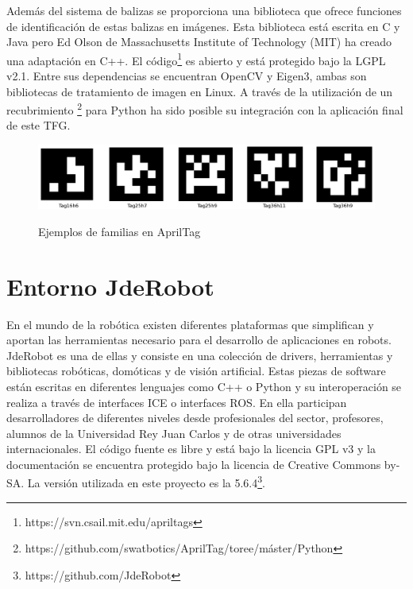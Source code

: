 {	Además del sistema de balizas se proporciona una biblioteca que ofrece funciones de identificación de estas balizas en imágenes. Esta biblioteca está escrita en C y Java pero Ed Olson de Massachusetts Institute of Technology (MIT) ha creado una adaptación en C++. El código\footnote{https://svn.csail.mit.edu/apriltags} es abierto y está protegido bajo la LGPL v2.1. Entre sus dependencias se encuentran OpenCV y Eigen3, ambas son bibliotecas de tratamiento de imagen en Linux. A través de la utilización de un recubrimiento \footnote{https://github.com/swatbotics/AprilTag/toree/máster/Python} para Python ha sido posible su integración con la aplicación final de este TFG.
	
	\begin{figure}[H]
		\centering
		{\includegraphics[scale=0.2]{imag/apriltags-codes.png}}
		\caption{Ejemplos de familias en AprilTag}
		
		\label{FIG:34_apriltag_families}
	\end{figure}
	
	
	\section{Entorno JdeRobot}
	\label{sec:Jderobot}
	
	En el mundo de la robótica existen diferentes plataformas que simplifican y aportan las herramientas necesario para el desarrollo de aplicaciones en robots. JdeRobot es una de ellas y consiste en una colección de drivers, herramientas y bibliotecas robóticas, domóticas y de visión artificial. Estas piezas de software están escritas en diferentes lenguajes como C++ o Python y su interoperación se realiza a través de interfaces ICE o interfaces ROS. En ella participan desarrolladores de diferentes niveles desde profesionales del sector, profesores, alumnos de la Universidad Rey Juan Carlos y de otras universidades internacionales. El código fuente es libre y está bajo la licencia GPL v3 y la documentación se encuentra protegido bajo la licencia de Creative Commons by-SA. La versión utilizada en este proyecto es la 5.6.4\footnote{https://github.com/JdeRobot}.
	
}
